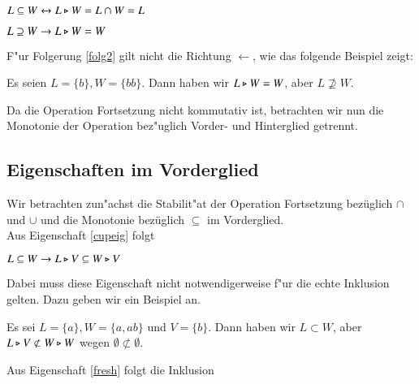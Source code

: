 \vspace{2ex}

\begin{folg}\label{folg1}
$L\subseteq W \leftrightarrow L\triangleright W = L\cap W = L$
\end{folg}

\vspace{2ex}

\begin{folg}\label{folg2}
$L\supseteq W \to L\triangleright W = W$
\end{folg}
F"ur Folgerung \ref{folg2} gilt nicht die Richtung $\leftarrow$, wie das folgende Beispiel zeigt:

\vspace{2ex}

\begin{beispiel}
Es seien $L=\{b\}, W=\{bb\}$. Dann haben wir $L\triangleright W = W$, aber $L\not\supseteq W$.
\end{beispiel}

Da die Operation Fortsetzung nicht kommutativ ist, betrachten wir nun die Monotonie der Operation bez"uglich Vorder- und Hinterglied getrennt.
\subsection{Eigenschaften im Vorderglied}

Wir betrachten zun"achst die Stabilit"at der Operation Fortsetzung bezüglich $\cap$ und $\cup$ und die Monotonie bezüglich $\subseteq$ im Vorderglied.\\
Aus Eigenschaft \ref{cupeig} folgt

\vspace{2ex}

\begin{eigen}\label{fresh}
$L\subseteq W \to L\triangleright V \subseteq W \triangleright V$
\end{eigen}
Dabei muss diese Eigenschaft nicht notwendigerweise f"ur die echte Inklusion gelten. Dazu geben wir ein Beispiel an.

\vspace{2ex}

\begin{beispiel}
Es sei $L=\{a\}, W=\{a,ab\}$ und $V=\{b\}$. Dann haben wir $L\subset W$, aber $L\triangleright V \not\subset W\triangleright W$ wegen $\emptyset \not\subset\emptyset$.
\end{beispiel}

Aus Eigenschaft \ref{fresh} folgt die Inklusion

\vspace{2ex}

